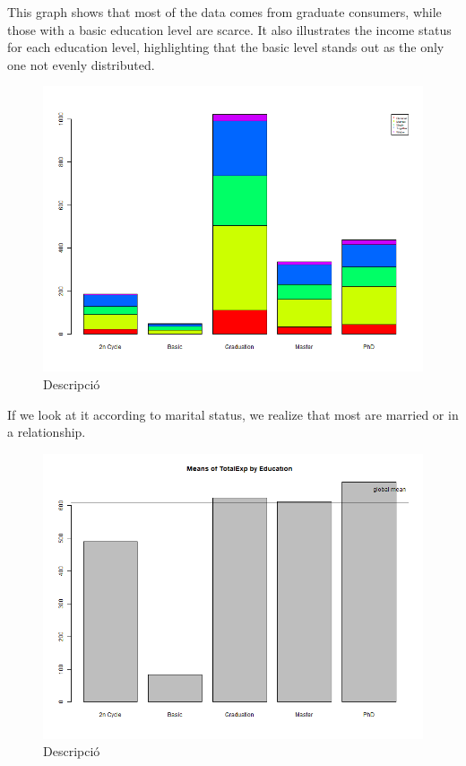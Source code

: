 This graph shows that most of the data comes from graduate consumers, while those with a basic education level are scarce. It also illustrates the income status for each education level, highlighting that the basic level stands out as the only one not evenly distributed.
\begin{figure}[H]
    \centering
    \includegraphics[width= 1\linewidth]{Imatges/stacked_barplot_counts_MaritalSts_10_legend(education).png}
    \caption{Descripció}
    \label{fig:scree_plot_1} %
\end{figure}

If we look at it according to marital status, we realize that most are married or in a relationship.

\begin{figure}[H]
    \centering
    \includegraphics[width= 1\linewidth]{Imatges/mean_barplot_TotalExp.png}
    \caption{Descripció}
    \label{fig:scree_plot_1} %
\end{figure}

